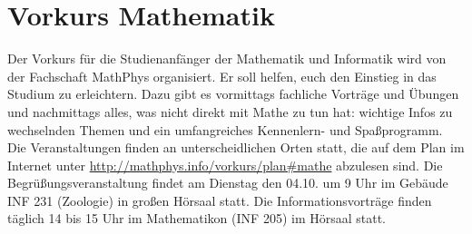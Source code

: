 \section{Vorkurs Mathematik}
\label{vkmathe}
Der Vorkurs für die Studienanfänger der Mathematik und Informatik wird von der
Fachschaft MathPhys organisiert. Er soll helfen, euch den Einstieg in das
Studium zu erleichtern. Dazu gibt es vormittags fachliche Vorträge und Übungen
und nachmittags alles, was nicht direkt mit Mathe zu tun hat: wichtige Infos zu
wechselnden Themen und ein umfangreiches Kennenlern- und Spaßprogramm. Die
Veranstaltungen finden an unterscheidlichen Orten statt, die auf dem Plan im
Internet unter \url{http://mathphys.info/vorkurs/plan\#mathe}
abzulesen sind. Die Begrüßungsveranstaltung findet am Dienstag den 04.10. um 9
Uhr im Gebäude \gls{INF} 231 (Zoologie) in großen Hörsaal statt. Die
Informationsvorträge finden täglich 14 bis 15 Uhr im Mathematikon
(\gls{INF} 205) im Hörsaal statt.
